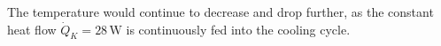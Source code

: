 The temperature would continue to decrease and drop further, as the constant heat flow \( \dot{Q}_K = 28 \, \text{W} \) is continuously fed into the cooling cycle.